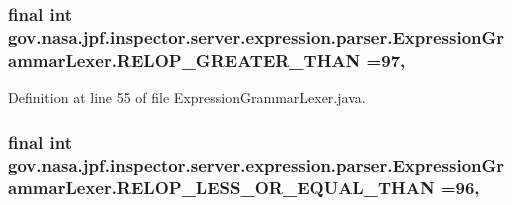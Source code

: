 \subsubsection[{\texorpdfstring{R\+E\+L\+O\+P\+\_\+\+G\+R\+E\+A\+T\+E\+R\+\_\+\+T\+H\+AN}{RELOP_GREATER_THAN}}]{\setlength{\rightskip}{0pt plus 5cm}final int gov.\+nasa.\+jpf.\+inspector.\+server.\+expression.\+parser.\+Expression\+Grammar\+Lexer.\+R\+E\+L\+O\+P\+\_\+\+G\+R\+E\+A\+T\+E\+R\+\_\+\+T\+H\+AN =97\hspace{0.3cm}{\ttfamily [static]}, {\ttfamily [package]}}\hypertarget{classgov_1_1nasa_1_1jpf_1_1inspector_1_1server_1_1expression_1_1parser_1_1_expression_grammar_lexer_a828a480355f27c4fd7e3ac5ed6971c6a}{}\label{classgov_1_1nasa_1_1jpf_1_1inspector_1_1server_1_1expression_1_1parser_1_1_expression_grammar_lexer_a828a480355f27c4fd7e3ac5ed6971c6a}


Definition at line 55 of file Expression\+Grammar\+Lexer.\+java.

\subsubsection[{\texorpdfstring{R\+E\+L\+O\+P\+\_\+\+L\+E\+S\+S\+\_\+\+O\+R\+\_\+\+E\+Q\+U\+A\+L\+\_\+\+T\+H\+AN}{RELOP_LESS_OR_EQUAL_THAN}}]{\setlength{\rightskip}{0pt plus 5cm}final int gov.\+nasa.\+jpf.\+inspector.\+server.\+expression.\+parser.\+Expression\+Grammar\+Lexer.\+R\+E\+L\+O\+P\+\_\+\+L\+E\+S\+S\+\_\+\+O\+R\+\_\+\+E\+Q\+U\+A\+L\+\_\+\+T\+H\+AN =96\hspace{0.3cm}{\ttfamily [static]}, {\ttfamily [package]}}\hypertarget{classgov_1_1nasa_1_1jpf_1_1inspector_1_1server_1_1expression_1_1parser_1_1_expression_grammar_lexer_a99e8d6a45b49e79cdd1dde8392d1fe15}{}\label{classgov_1_1nasa_1_1jpf_1_1inspector_1_1server_1_1expression_1_1parser_1_1_expression_grammar_lexer_a99e8d6a45b49e79cdd1dde8392d1fe15}


